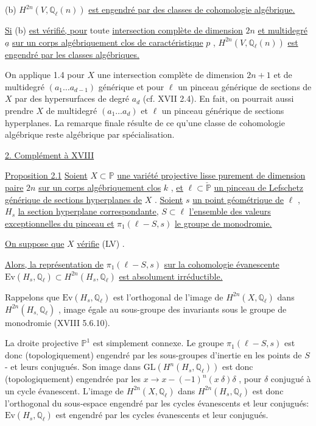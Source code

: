 (b) $H^{2n}(V, \mathbb{Q}_\ell(n))$ \underline{est engendré par des classes de cohomologie algébrique.}

\underline{Si} (b) \underline{est vérifié, pour} toute \underline{intersection complète de dimension} $2n$ \underline{et multidegré} $\underline{a}$ \underline{sur un corps algébriquement clos de caractéristique} $p$ , $H^{2n}(V, \mathbb{Q}_\ell(n))$ \underline{est engendré par les classes algébriques.}

On applique 1.4 pour $X$ une intersection complète de dimension $2n+1$ et de multidegré $(a_1 \ldots a_{d-1})$ générique et pour $\ell$ un pinceau générique de sections de $X$ par des hypersurfaces de degré $a_d$ (cf. XVII 2.4). En fait, on pourrait aussi prendre $X$ de multidegré $(a_1 \ldots a_d)$ et $\ell$ un pinceau générique de sections hyperplanes. La remarque finale résulte de ce qu'une classe de cohomologie algébrique reste algébrique par spécialisation.


\underline{2. Complément à XVIII}

\underline{Proposition 2.1} \quad \underline{Soient} $X \subset \mathbb{P}$ \underline{une variété projective lisse purement de dimension paire} $2n$ \underline{sur un corps algébriquement clos} $k$ , \underline{et} $\ell \subset \check{\mathbb{P}}$ \underline{un pinceau de Lefschetz générique de sections hyperplanes de} $X$ . \underline{Soient} $s$ \underline{un point géométrique de} $\ell$ , $H_s$ \underline{la section hyperplane correspondante,} $S \subset \ell$ \underline{l'ensemble des valeurs exceptionnelles du pinceau et} $\pi_1(\ell - S, s)$ \underline{le groupe de monodromie.}

\underline{On suppose que} $X$ \underline{vérifie} (LV) .

\underline{Alors, la représentation de} $\pi_1(\ell - S, s)$ \underline{sur la cohomologie évanescente} $\mathrm{Ev}(H_s, \mathbb{Q}_\ell) \subset H^{2n}(H_s, \mathbb{Q}_\ell)$ \underline{est absolument irréductible.}

Rappelons que $\mathrm{Ev}(H_s, \mathbb{Q}_\ell)$ est l'orthogonal de l'image de $H^{2n}(X, \mathbb{Q}_\ell)$ dans $H^{2n}(H_{s,} \mathbb{Q}_\ell)$ , image égale au sous-groupe des invariants sous le groupe de monodromie (XVIII 5.6.10).



La droite projective $\mathbb{P}^1$ est simplement connexe. Le groupe $\pi_1(\ell - S, s)$ est donc (topologiquement) engendré par les sous-groupes d'inertie en les points de $S$ - et leurs conjugués. Son image dans $\mathrm{GL}(H^n(H_s, \mathbb{Q}_\ell))$ est donc (topologiquement) engendrée par les $x \longrightarrow x - (-1)^n(x\ \delta)\delta$ , pour $\delta$ conjugué à un cycle évanescent. L'image de $H^{2n}(X, \mathbb{Q}_\ell)$ dans $H^{2n}(H_s, \mathbb{Q}_\ell)$ est donc l'orthogonal du sous-espace engendré par les cycles évanescents et leur conjugués: $\mathrm{Ev}(H_s, \mathbb{Q}_\ell)$ est engendré par les cycles évanescents et leur conjugués.

